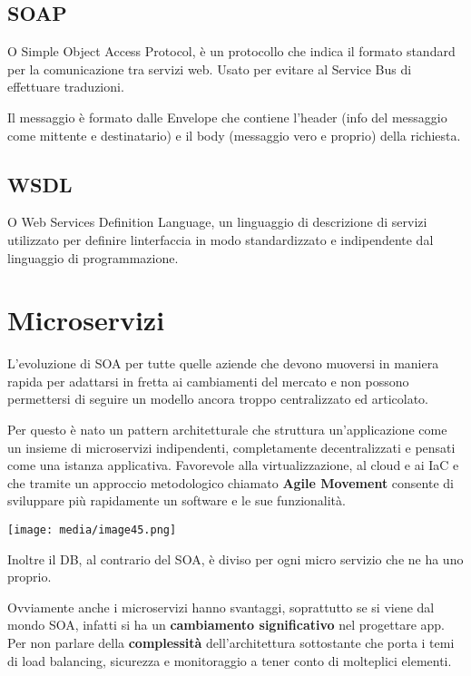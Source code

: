 \subsection{SOAP}\label{soap}

O Simple Object Access Protocol, è un protocollo che indica il formato
standard per la comunicazione tra servizi web. Usato per evitare al
Service Bus di effettuare traduzioni.

Il messaggio è formato dalle Envelope che contiene l'header (info del
messaggio come mittente e destinatario) e il body (messaggio vero e
proprio) della richiesta.

\subsection{WSDL}\label{wsdl}

O Web Services Definition Language, un linguaggio di descrizione di
servizi utilizzato per definire l\textquotesingle interfaccia in modo
standardizzato e indipendente dal linguaggio di programmazione.

\section{Microservizi}\label{microservizi}

L'evoluzione di SOA per tutte quelle aziende che devono muoversi in
maniera rapida per adattarsi in fretta ai cambiamenti del mercato e non
possono permettersi di seguire un modello ancora troppo centralizzato ed
articolato.

Per questo è nato un pattern architetturale che struttura
un'applicazione come un insieme di microservizi indipendenti,
completamente decentralizzati e pensati come una istanza applicativa.
Favorevole alla virtualizzazione, al cloud e ai IaC e che tramite un
approccio metodologico chiamato \textbf{Agile Movement} consente di
sviluppare più rapidamente un software e le sue funzionalità.

\texttt{[image: media/image45.png]}

Inoltre il DB, al contrario del SOA, è diviso per ogni micro servizio
che ne ha uno proprio.

Ovviamente anche i microservizi hanno svantaggi, soprattutto se si viene
dal mondo SOA, infatti si ha un \textbf{cambiamento significativo} nel
progettare app. Per non parlare della \textbf{complessità}
dell'architettura sottostante che porta i temi di load balancing,
sicurezza e monitoraggio a tener conto di molteplici elementi.

